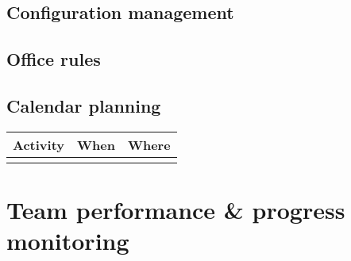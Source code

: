 \documentclass{article}
\begin{document}
\subsection{Configuration management}

\subsection{Office rules}

\subsection{Calendar planning}


\begin{tabel}
    \centering
    \begin{tabular}{l|l|l}
        \rowcolor{Gray}
        \textbf{Activity} & \textbf{When} & \textbf{Where}\\\hline
                             & &
    \end{tabular}
    \label{tab:roleTypes}
\end{tabel}

\section{Team performance \& progress monitoring}
\end{document}
